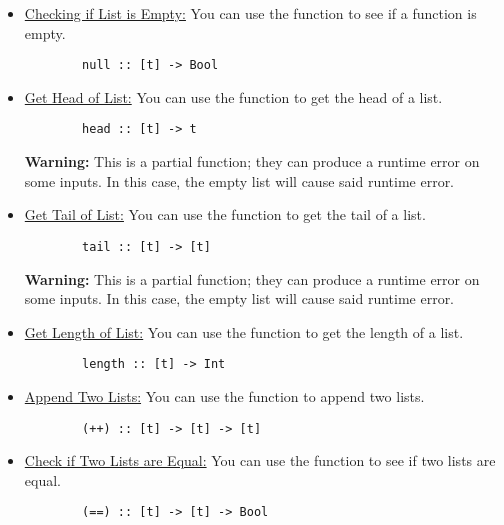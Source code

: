 \documentclass[letterpaper]{article}
\begin{document}
\begin{itemize}
    \item \underline{Checking if List is Empty:} You can use the function  to see if a function is empty. 
    \begin{verbatim}
        null :: [t] -> Bool \end{verbatim}

    \item \underline{Get Head of List:} You can use the function  to get the head of a list. 
    \begin{verbatim}
        head :: [t] -> t\end{verbatim}
    \textbf{Warning:} This is a partial function; they can produce a runtime error on some inputs. In this case, the empty list \code{[]} will cause said runtime error.
    
    \item \underline{Get Tail of List:} You can use the function  to get the tail of a list. 
    \begin{verbatim}
        tail :: [t] -> [t]\end{verbatim}
    \textbf{Warning:} This is a partial function; they can produce a runtime error on some inputs. In this case, the empty list \code{[]} will cause said runtime error.
    
    \item \underline{Get Length of List:} You can use the function  to get the length of a list. 
    \begin{verbatim}
        length :: [t] -> Int \end{verbatim}

    \item \underline{Append Two Lists:} You can use the function \code{(++)} to append two lists. 
    \begin{verbatim}
        (++) :: [t] -> [t] -> [t]\end{verbatim}

    \item \underline{Check if Two Lists are Equal:} You can use the function \code{(==)} to see if two lists are equal. 
    \begin{verbatim}
        (==) :: [t] -> [t] -> Bool\end{verbatim}
\end{itemize}
\end{document}
